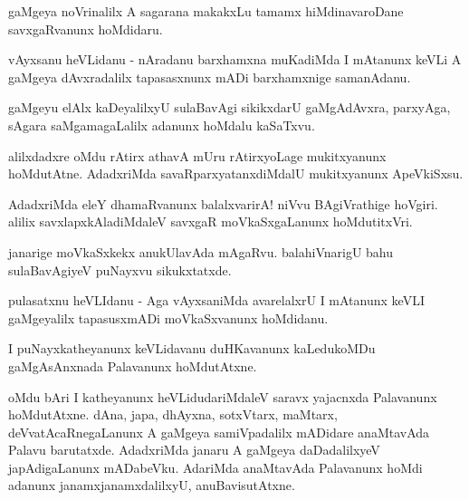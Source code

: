 \documentclass{article}
\begin{document}
\begin{mng}%
gaMgeya noVrinalilx A sagarana makakxLu tamamx hiMdinavaroDane 
savxgaRvanunx hoMdidaru.
\end{mng}

\begin{mng}%
vAyxsanu heVLidanu - nAradanu barxhamxna muKadiMda I mAtanunx keVLi A 
gaMgeya dAvxradalilx tapasasxnunx mADi barxhamxnige samanAdanu.
\end{mng}

\begin{mng}%
gaMgeyu elAlx kaDeyalilxyU sulaBavAgi sikikxdarU gaMgAdAvxra, 
parxyAga, sAgara saMgamagaLalilx adanunx hoMdalu kaSaTxvu.
\end{mng}

\begin{mng}%
alilxdadxre oMdu rAtirx athavA mUru rAtirxyoLage mukitxyanunx 
hoMdutAtne. AdadxriMda savaRparxyatanxdiMdalU mukitxyanunx ApeVkiSxsu.
\end{mng}

\begin{mng}%
AdadxriMda eleY dhamaRvanunx balalxvarirA! niVvu BAgiVrathige hoVgiri. 
alilix savxlapxkAladiMdaleV savxgaR moVkaSxgaLanunx hoMdutitxVri.
\end{mng}

\begin{mng}%
janarige moVkaSxkekx anukUlavAda mAgaRvu. balahiVnarigU bahu 
sulaBavAgiyeV puNayxvu sikukxtatxde.
\end{mng}

\begin{mng}%
pulasatxnu heVLIdanu - Aga vAyxsaniMda avarelalxrU I mAtanunx keVLI 
gaMgeyalilx tapasusxmADi moVkaSxvanunx hoMdidanu.
\end{mng}

\begin{mng}%
I puNayxkatheyanunx keVLidavanu duHKavanunx kaLedukoMDu gaMgAsAnxnada 
Palavanunx hoMdutAtxne.
\end{mng}

\begin{mng}%
oMdu bAri I katheyanunx heVLidudariMdaleV saravx yajacnxda Palavanunx 
hoMdutAtxne. dAna, japa, dhAyxna, sotxVtarx, maMtarx, 
deVvatAcaRnegaLanunx A gaMgeya samiVpadalilx mADidare anaMtavAda 
Palavu barutatxde. AdadxriMda janaru A gaMgeya daDadalilxyeV 
japAdigaLanunx mADabeVku. AdariMda anaMtavAda Palavanunx hoMdi adanunx 
janamxjanamxdalilxyU, anuBavisutAtxne.
\end{mng}
\end{document}
